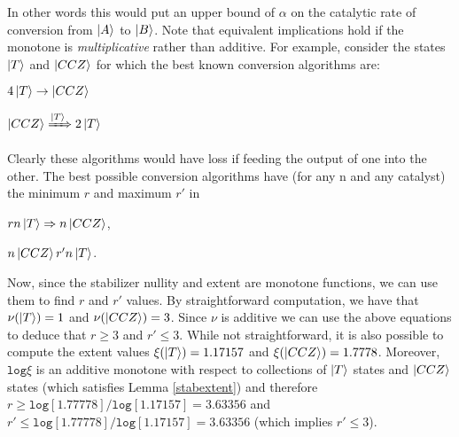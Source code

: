 \documentclass[12pt]{dalthesis}
\begin{document}
In other words this would put an upper bound of $\alpha$ on the catalytic rate of conversion from $\ket{A}$ to $\ket{B}$. Note that equivalent implications hold if the monotone is \textit{multiplicative} rather than additive.
For example, consider the states $\ket{T}$ and $\ket{CCZ}$ for which the best known conversion algorithms are:
\begin{center}
$4\ket{T} \rightarrow \ket{CCZ}$
\end{center}
\begin{center}
$\ket{CCZ} \xRightarrow{\ket{T}} 2\ket{T}$
\end{center}
Clearly these algorithms would have loss if feeding the output of one into the other. The best possible conversion algorithms have (for any n and any catalyst) the minimum $r$ and maximum $r'$ in 
\begin{center}
$rn\ket{T} \Rightarrow n\ket{CCZ}$,
\end{center}
\begin{center}
$n\ket{CCZ} r'n\ket{T}$.
\end{center}

Now, since the stabilizer nullity and extent are monotone functions, we can use them to find $r$ and $r'$ values. By straightforward computation, we have that $\nu (\ket{T}) = 1$ and $\nu(\ket{CCZ}) = 3$. Since $\nu$ is additive we can use the above equations to deduce that $r \geq 3$ and $r' \leq 3$. While not straightforward, it is also possible to compute the extent values $\xi (\ket{T}) = 1.17157$ and $\xi (\ket{CCZ}) = 1.7778$. Moreover, $\texttt{log} \xi$ is an additive monotone with respect to collections of $\ket{T}$ states and $\ket{CCZ}$ states (which satisfies Lemma \ref{stabextent}) and therefore $r \geq \texttt{log}[1.77778]/\texttt{log}[1.17157] = 3.63356$ and $r' \leq \texttt{log}[1.77778]/\texttt{log}[1.17157] = 3.63356$ (which implies $r' \leq 3$).
\end{document}
